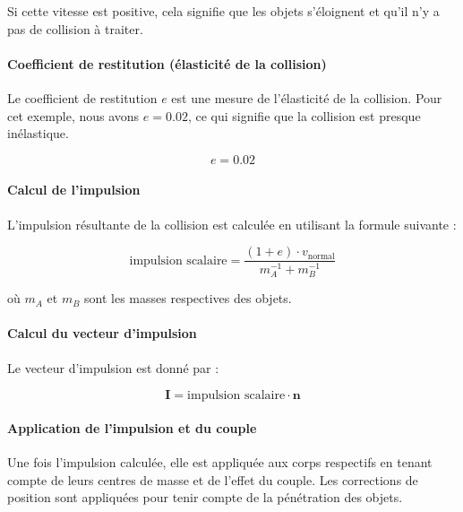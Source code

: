 \begin{multicols}{2}
        Si cette vitesse est positive, cela signifie que les objets s'éloignent et
        qu'il n'y a pas de collision à traiter.
        
        \paragraph{Coefficient de restitution (élasticité de la collision)}
        Le coefficient de restitution \( e \) est une mesure de l'élasticité de la
        collision. Pour cet exemple, nous avons \( e = 0.02 \), ce qui signifie que
        la collision est presque inélastique.
        
        \begin{equation}
        e = 0.02
        \end{equation}
        
        \columnbreak  %
        
        \paragraph{Calcul de l'impulsion}
        L'impulsion résultante de la collision est calculée en utilisant la formule
        suivante :
        
        \begin{equation}
        \text{impulsion scalaire} = \frac{(1 + e) \cdot v_{\text{normal}}}{m_A^{-1} + m_B^{-1}}
        \end{equation}
        
        où \( m_A \) et \( m_B \) sont les masses respectives des objets.
        
        \paragraph{Calcul du vecteur d'impulsion}
        Le vecteur d'impulsion est donné par :
        
        \begin{equation}
        \mathbf{I} = \text{impulsion scalaire} \cdot \mathbf{n}
        \end{equation}
        
        \paragraph{Application de l'impulsion et du couple}
        Une fois l'impulsion calculée, elle est appliquée aux corps respectifs en tenant
        compte de leurs centres de masse et de l'effet du couple. Les corrections de
        position sont appliquées pour tenir compte de la pénétration des objets.
        

\end{multicols}
